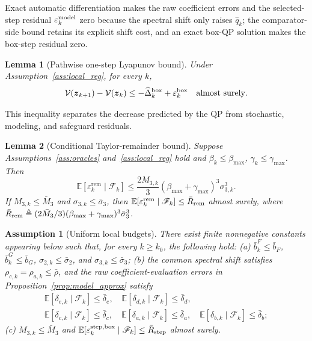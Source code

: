 \documentclass{article}
\newtheorem{lemma}{Lemma}
\newtheorem{assumption}{Assumption}
\theoremstyle{remark}
\newcommand{\E}{\mathbb{E}}
\newcommand{\bz}{\boldsymbol{z}}
\newcommand{\Vk}{\mathcal{V}}
\begin{document}
Exact automatic differentiation makes the raw coefficient errors and the selected-step residual $\varepsilon_k^{\rm model}$ zero because the spectral shift only raises $\hat q_k$; the comparator-side bound retains its explicit shift cost, and an exact box-QP solution makes the box-step residual zero.

\begin{lemma}[Pathwise one-step Lyapunov bound]\label{lem:pathwise_drift}
Under Assumption~\ref{ass:local_reg}, for every $k$,
\begin{equation}\label{eq:pathwise_drift}
\Vk(\bz_{k+1})-\Vk(\bz_{k})
\le -\widehat\Delta_{k}^{\rm box}+\varepsilon_{k}^{\rm box}
\quad\text{almost surely}.
\end{equation}
\end{lemma}

This inequality separates the decrease predicted by the QP from stochastic, modeling, and safeguard residuals.

\begin{lemma}[Conditional Taylor-remainder bound]\label{lem:residual_budget}
Suppose Assumptions~\ref{ass:oracles} and~\ref{ass:local_reg} hold and $\beta_{k}\le\beta_{\max}$, $\gamma_{k}\le\gamma_{\max}$.
Then
\begin{equation}\label{eq:eps_rem_cond}
\E[\varepsilon_{k}^{\mathrm{rem}}\mid\mathscr{F}_{k}]
\le
\frac{2M_{3,k}}{3}(\beta_{\max}+\gamma_{\max})^{3}\sigma_{3,k}^{3}.
\end{equation}
If $M_{3,k}\le\bar M_{3}$ and $\sigma_{3,k}\le\bar\sigma_{3}$, then $\E[\varepsilon_{k}^{\mathrm{rem}}\mid\mathscr F_k]\le\bar R_{\rm rem}$ almost surely, where $\bar R_{\rm rem}\triangleq(2\bar M_3/3)(\beta_{\max}+\gamma_{\max})^3\bar\sigma_3^3$.
\end{lemma}

\begin{assumption}[Uniform local budgets]\label{ass:budget}
There exist finite nonnegative constants appearing below such that, for every $k\ge k_0$, the following hold:
(a) $\bar b_k^F\le\bar b_F$, $\bar b_k^G\le\bar b_G$, $\sigma_{2,k}\le\bar\sigma_2$, and $\sigma_{3,k}\le\bar\sigma_3$;
(b) the common spectral shift satisfies $\rho_{c,k}=\rho_{a,k}\le\bar\rho$, and the raw coefficient-evaluation errors in Proposition~\ref{prop:model_approx} satisfy
\[
\begin{gathered}
\E[\delta_{e,k}\mid\mathscr F_k]\le\bar\delta_e,
\quad
\E[\delta_{d,k}\mid\mathscr F_k]\le\bar\delta_d,\\
\E[\delta_{c,k}\mid\mathscr F_k]\le\bar\delta_c,
\quad
\E[\delta_{a,k}\mid\mathscr F_k]\le\bar\delta_a,
\quad
\E[\delta_{b,k}\mid\mathscr F_k]\le\bar\delta_b;
\end{gathered}
\]
(c) $M_{3,k}\le\bar M_3$ and $\E[\varepsilon_k^{\rm step,box}\mid\mathscr F_k]\le\bar R_{\rm step}$ almost surely.
\end{assumption}
\end{document}
